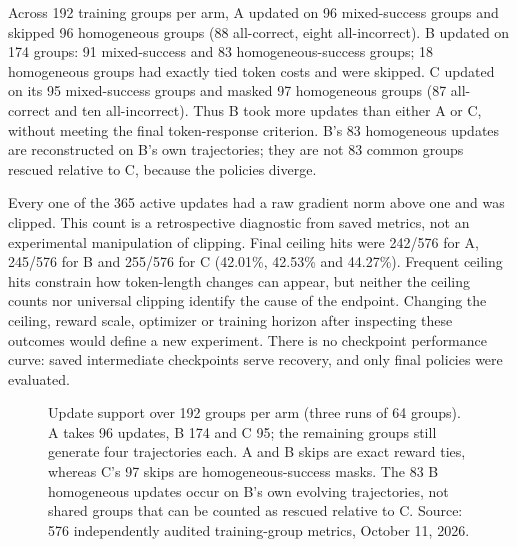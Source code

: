 \documentclass[11pt]{article}
\begin{document}
Across 192 training groups per arm, A updated on 96 mixed-success groups and skipped 96 homogeneous groups (88 all-correct, eight all-incorrect). B updated on 174 groups: 91 mixed-success and 83 homogeneous-success groups; 18 homogeneous groups had exactly tied token costs and were skipped. C updated on its 95 mixed-success groups and masked 97 homogeneous groups (87 all-correct and ten all-incorrect). Thus B took more updates than either A or C, without meeting the final token-response criterion. B's 83 homogeneous updates are reconstructed on B's own trajectories; they are not 83 common groups rescued relative to C, because the policies diverge.

Every one of the 365 active updates had a raw gradient norm above one and was clipped. This count is a retrospective diagnostic from saved metrics, not an experimental manipulation of clipping. Final ceiling hits were 242/576 for A, 245/576 for B and 255/576 for C (42.01\%, 42.53\% and 44.27\%). Frequent ceiling hits constrain how token-length changes can appear, but neither the ceiling counts nor universal clipping identify the cause of the endpoint. Changing the ceiling, reward scale, optimizer or training horizon after inspecting these outcomes would define a new experiment. There is no checkpoint performance curve: saved intermediate checkpoints serve recovery, and only final policies were evaluated.


\begin{figure}[htbp]
\centering
{}
\caption{Update support over 192 groups per arm (three runs of 64 groups). A takes 96 updates, B 174 and C 95; the remaining groups still generate four trajectories each. A and B skips are exact reward ties, whereas C's 97 skips are homogeneous-success masks. The 83 B homogeneous updates occur on B's own evolving trajectories, not shared groups that can be counted as rescued relative to C. Source: 576 independently audited training-group metrics, October 11, 2026.}
\label{fig:mechanism-update-support}
\end{figure}
\end{document}
